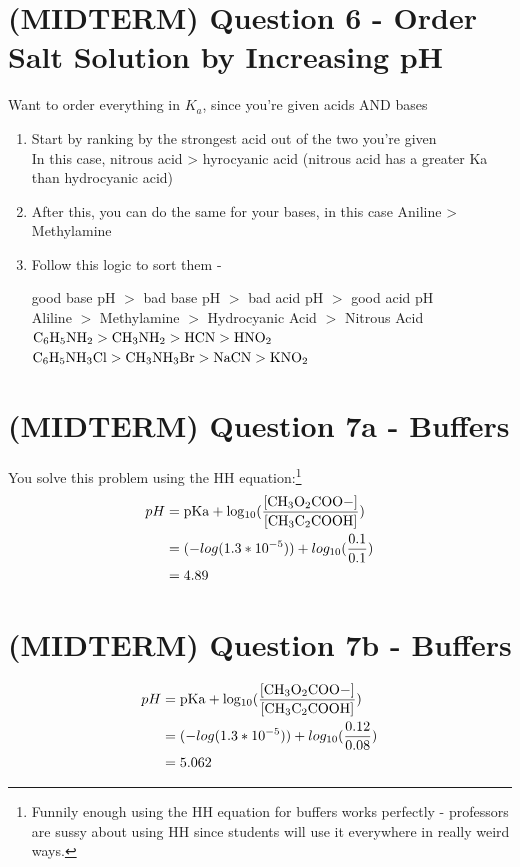 \documentclass{article}  %
\begin{document}
\section*{(MIDTERM) Question 6 - Order Salt Solution by Increasing pH}
Want to order everything in $K_a$, since you're given acids AND bases
\begin{enumerate}
    \item Start by ranking by the strongest acid out of the two you're given  \\
        In this case, nitrous acid > hyrocyanic acid (nitrous acid has a greater Ka than hydrocyanic acid)
    \item After this, you can do the same for your bases, in this case Aniline > Methylamine
    \item Follow this logic to sort them -
    \begin{center}
        good base pH $>$ bad base pH $>$ bad acid pH $>$ good acid pH \\
        Aliline $>$ Methylamine $>$ Hydrocyanic Acid $>$ Nitrous Acid \\
        $\ce{C6H5NH2} > \ce{CH3NH2} > \ce{HCN} > \ce{HNO2}$ \\
        $\ce{C6H5NH3Cl} > \ce{CH3NH3Br} > \ce{NaCN} > \ce{KNO2}$
    \end{center}
\end{enumerate}

\section*{(MIDTERM) Question 7a - Buffers}
You solve this problem using the HH equation:\footnote{Funnily enough using the HH equation for buffers works perfectly - professors are sussy about using HH since students will use it everywhere in really weird ways.}
\begin{equation*}
    \begin{aligned}
        pH &= \ce{pKa + log_{10}(\frac{[CH3O2COO-]}{[CH3C2COOH]})} \\
           &= (-log(1.3*10^{-5})) + log_{10}(\frac{0.1}{0.1}) \\
           &= 4.89
    \end{aligned}
\end{equation*}

\section*{(MIDTERM) Question 7b - Buffers}
\begin{equation*}
    \begin{aligned}
        pH &= \ce{pKa + log_{10}(\frac{[CH3O2COO-]}{[CH3C2COOH]})} \\
           &= (-log(1.3*10^{-5})) + log_{10}(\frac{0.12}{0.08}) \\
           &= 5.062
    \end{aligned}
\end{equation*}
\end{document}
